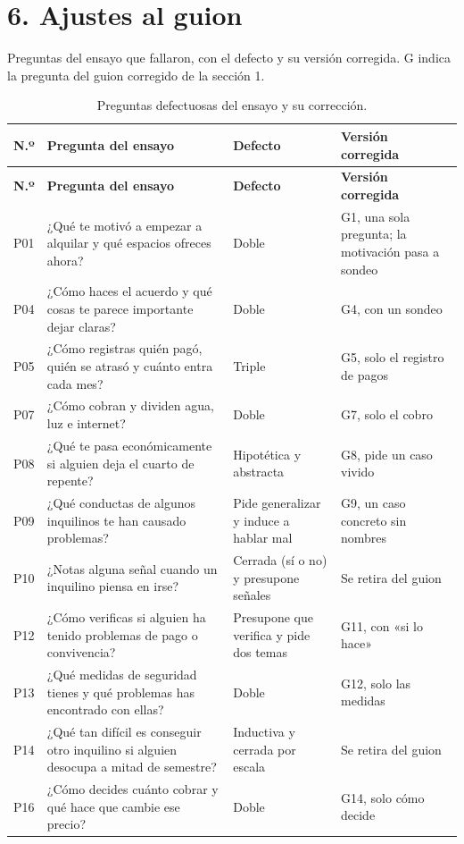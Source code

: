 \documentclass[11pt,a4paper]{article}
\begin{document}
\section*{6. Ajustes al guion}

Preguntas del ensayo que fallaron, con el defecto y su versión corregida. G indica la pregunta del guion corregido de la sección 1.

\renewcommand{\arraystretch}{1.15}
\small
\begin{longtable}{>{\raggedright\arraybackslash}p{1.0cm}>{\raggedright\arraybackslash}p{6.4cm}>{\raggedright\arraybackslash}p{3.6cm}>{\raggedright\arraybackslash}p{4.6cm}}
\caption{Preguntas defectuosas del ensayo y su corrección.}\label{tab:ajustes}\\
\toprule
\textbf{N.º} & \textbf{Pregunta del ensayo} & \textbf{Defecto} & \textbf{Versión corregida}\\
\midrule
\endfirsthead
\toprule
\textbf{N.º} & \textbf{Pregunta del ensayo} & \textbf{Defecto} & \textbf{Versión corregida}\\
\midrule
\endhead
P01 & ¿Qué te motivó a empezar a alquilar y qué espacios ofreces ahora? & Doble & G1, una sola pregunta; la motivación pasa a sondeo\\
P04 & ¿Cómo haces el acuerdo y qué cosas te parece importante dejar claras? & Doble & G4, con un sondeo\\
P05 & ¿Cómo registras quién pagó, quién se atrasó y cuánto entra cada mes? & Triple & G5, solo el registro de pagos\\
P07 & ¿Cómo cobran y dividen agua, luz e internet? & Doble & G7, solo el cobro\\
P08 & ¿Qué te pasa económicamente si alguien deja el cuarto de repente? & Hipotética y abstracta & G8, pide un caso vivido\\
P09 & ¿Qué conductas de algunos inquilinos te han causado problemas? & Pide generalizar y induce a hablar mal & G9, un caso concreto sin nombres\\
P10 & ¿Notas alguna señal cuando un inquilino piensa en irse? & Cerrada (sí o no) y presupone señales & Se retira del guion\\
P12 & ¿Cómo verificas si alguien ha tenido problemas de pago o convivencia? & Presupone que verifica y pide dos temas & G11, con «si lo hace»\\
P13 & ¿Qué medidas de seguridad tienes y qué problemas has encontrado con ellas? & Doble & G12, solo las medidas\\
P14 & ¿Qué tan difícil es conseguir otro inquilino si alguien desocupa a mitad de semestre? & Inductiva y cerrada por escala & Se retira del guion\\
P16 & ¿Cómo decides cuánto cobrar y qué hace que cambie ese precio? & Doble & G14, solo cómo decide\\
\bottomrule
\end{longtable}
\normalsize
\end{document}

